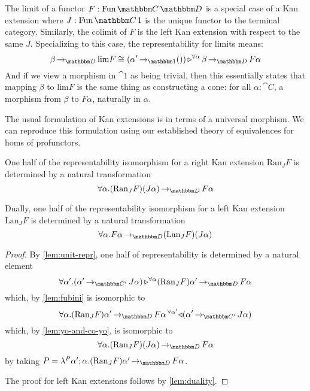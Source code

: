 \documentclass{llncs}
\begin{document}
The limit of a functor $F : \varr{\cat C}{\cat D}$ is a special case
of a Kan extension where $J : \varr{\cat C}{1}$ is the unique functor
to the terminal category. Similarly, the colimit of $F$ is the left
Kan extension with respect to the same $J$.
%
Specializing to this case, the representability for limits means:
\[ \punitinXfromYtoZ {\cat D}{\beta}{\textrm{lim} F} \cong \homrallXYtoZ {\alpha}{(\punitinXfromYtoZ {\cat 1}{\alpha'}{()})}{\punitinXfromYtoZ {\cat D}{\beta}{F \alpha}} \]
And if we view a morphism in $\cat 1$ as being trivial, then this
essentially states that mapping $\beta$ to $\textrm{lim} F$ is the
same thing as constructing a cone: for all $\alpha :\cat C$, a
morphism from $\beta$ to $F \alpha$, naturally in $\alpha$.

The usual formulation of Kan extensions is in terms of a universal
morphism.
%
We can reproduce this formulation using our established theory of
equivalences for homs of profunctors.
\begin{lemma}
  One half of the representability isomorphism for a right Kan
  extension $\textrm{Ran}_J F$ is determined by a natural
  transformation
  \[ \pendallXdotY \alpha \punitinXfromYtoZ {\cat D}{(\textrm{Ran}_JF)(J\alpha)}{F\alpha} \]

  Dually, one half of the representability isomorphism for a left Kan
  extension $\textrm{Lan}_J F$ is determined by a natural
  transformation
  \[ \pendallXdotY \alpha \punitinXfromYtoZ {\cat D}{F\alpha}{(\textrm{Lan}_JF)(J\alpha)} \]
\end{lemma}
\begin{proof}
  By \cref{lem:unit-repr}, one half of representability is determined by a natural element
  \[ \pendallXdotY {\alpha'} \homrallXYtoZ {\alpha}{(\punitinXfromYtoZ {\cat C'}{\alpha'}{J\alpha})} {\punitinXfromYtoZ {\cat D}{(\textrm{Ran}_J F)\alpha'}{F \alpha}} \]
  which, by \cref{lem:fubini} is isomorphic to
  \[
  \pendallXdotY {\alpha} \homlallXYtoZ {\alpha'}{(\punitinXfromYtoZ {\cat C'}{\alpha'}{J\alpha})}{\punitinXfromYtoZ {\cat D}{(\textrm{Ran}_J F)\alpha'}{F \alpha}}
  \]
  which, by \cref{lem:yo-and-co-yo}, is isomorphic to 
  \[ \pendallXdotY \alpha \punitinXfromYtoZ {\cat D}{(\textrm{Ran}_JF)(J\alpha)}{F\alpha} \]
  by taking $P = \hlambda {\alpha'}{\alpha} {\punitinXfromYtoZ {\cat D}{(\textrm{Ran}_J F)\alpha'}{F \alpha}}$.

  The proof for left Kan extensions follows by \cref{lem:duality}.
\end{proof}
\end{document}
